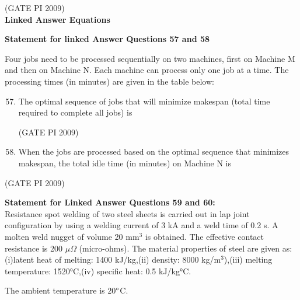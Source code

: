 \documentclass[journal,12pt,onecolumn]{IEEEtran}
\theoremstyle{remark}
\begin{document}
\hfill (GATE PI 2009) \\
\textbf{\large{Linked Answer Equations}}

\textbf{Statement for linked Answer Questions 57 and 58}

 Four jobs need to be processed sequentially on two machines, first on Machine M and then on Machine N. Each machine can process only one job at a time. The processing times (in minutes) are given in the table below:

\begin{enumerate}[label=Q.\arabic*, leftmargin=*]
\setcounter{enumi}{56}
\item The optimal sequence of jobs that will minimize makespan (total time required to complete all jobs) is
\begin{enumerate}
\end{enumerate}
\hfill (GATE PI 2009)
\item When the jobs are processed based on the optimal sequence that minimizes makespan, the total idle time (in minutes) on Machine N is
\begin{enumerate}
\end{enumerate}
\end{enumerate}
\hfill (GATE PI 2009)

\textbf{Statement for Linked Answer Questions 59 and 60:} \\
Resistance spot welding of two steel sheets is carried out in lap joint configuration by using a welding current of 3 kA and a weld time of 0.2 s. A molten weld nugget of volume 20 mm$^3$ is obtained. The effective contact resistance is 200 $\mu\Omega$ (micro-ohms). The material properties of steel are given as: (i)latent heat of melting: 1400 kJ/kg,(ii) density: 8000 kg/m$^3$),(iii) melting temperature: 1520°C,(iv) specific heat: 0.5 kJ/kg°C.

The ambient temperature is 20$\degree$C.
\end{document}

